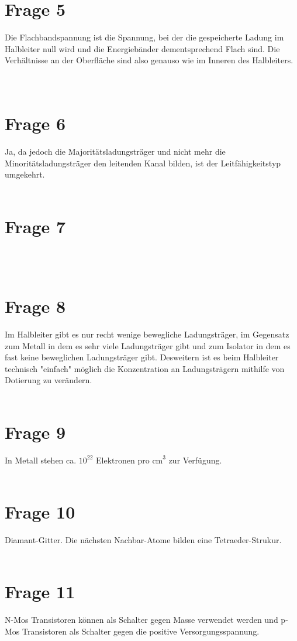 \documentclass[a4paper]{scrartcl}
\begin{document}
\section*{Frage 5}
Die Flachbandspannung ist die Spannung, bei der die gespeicherte Ladung im Halbleiter null wird und die Energiebänder dementsprechend Flach sind. Die Verhältnisse an der Oberfläche sind also genauso wie im Inneren des Halbleiters.
~\\
~\\
\section*{Frage 6}
Ja, da jedoch die Majoritätsladungsträger und nicht mehr die Minoritätsladungsträger den leitenden Kanal bilden, ist der Leitfähigkeitstyp umgekehrt.
~\\
~\\
\section*{Frage 7}

~\\
~\\
\section*{Frage 8}
Im Halbleiter gibt es nur recht wenige bewegliche Ladungsträger, im Gegensatz zum Metall in dem es sehr viele Ladungsträger gibt und zum Isolator in dem es fast keine beweglichen Ladungsträger gibt. Desweitern ist es beim Halbleiter technisch "einfach" möglich die Konzentration an Ladungsträgern mithilfe von Dotierung zu verändern.
~\\
~\\
\section*{Frage 9}
In Metall stehen ca. $10^{22} \text{ Elektronen pro cm}^3$ zur Verfügung.
~\\
~\\
\section*{Frage 10}
Diamant-Gitter. Die nächsten Nachbar-Atome bilden eine Tetraeder-Strukur.
~\\
~\\
\section*{Frage 11}
N-Mos Transistoren können als Schalter gegen Masse verwendet werden und p-Mos Transistoren als Schalter gegen die positive Versorgungsspannung.
~\\
~\\
\end{document}
